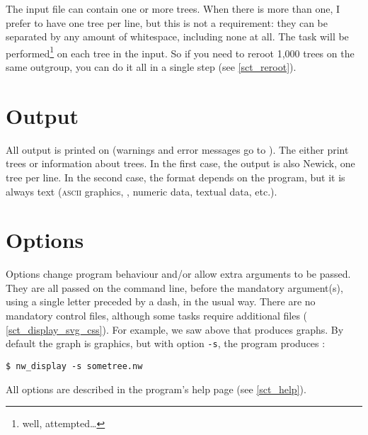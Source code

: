 The input file can contain one or more trees. When there is more than one, I
prefer to have one tree per line, but this is not a requirement: they can be
separated by any amount of whitespace, including none at all. The task will be
performed\footnote{well, attempted\ldots} on each tree in the input. So if you
need to reroot 1,000 trees on the same outgroup, you can do it all in a single
step (see \ref{sct_reroot}). 

\section{Output}
\label{sct_output}

All output is printed on \stdout{} (warnings and error messages go to \stderr).
The \nutils{} either print trees or information about trees. In the first case,
the output is also Newick, one tree per line. In the second case, the format
depends on the program, but it is always text (\textsc{ascii} graphics, \svg,
numeric data, textual data, etc.).

\section{Options}
\label{sct_options}

Options change program behaviour and/or allow extra arguments to be passed.
They are all passed on the command line, before the mandatory argument(s),
using a single letter preceded by a dash, in the usual \unix{} way. There are
no mandatory control files, although some tasks require additional files (\eg{}
\ref{sct_display_svg_css}). For example, we saw above that \display{} produces
graphs. By default the graph is \ascii{} graphics, but with option \texttt{-s},
the program produces \svg:
\begin{verbatim}
$ nw_display -s sometree.nw
\end{verbatim}
All options are described in the program's help page (see \ref{sct_help}).
